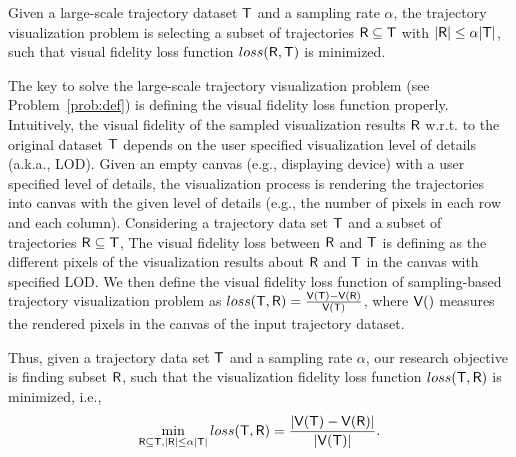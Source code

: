 \begin{problem}\label{prob:def}
Given a large-scale trajectory dataset $\mathsf{T}$ and a sampling rate $\alpha$,
the trajectory visualization problem is selecting a subset of trajectories $\mathsf{R} \subseteq \mathsf{T}$ with $|\mathsf{R}| \leq \alpha |\mathsf{T}|$,
such that visual fidelity loss function $loss(\mathsf{R},\mathsf{T})$ is minimized.
\end{problem}



The key to solve the large-scale trajectory visualization problem (see Problem~\ref{prob:def}) is defining the visual fidelity loss function properly.
Intuitively, the visual fidelity of the sampled visualization results $\mathsf{R}$ w.r.t. to the original dataset $\mathsf{T}$ depends on the user specified visualization level of details (a.k.a., LOD).
Given an empty canvas (e.g., displaying device) with a user specified level of details,
the visualization process is rendering the trajectories into canvas with the given level of details (e.g., the number of pixels in each row and each column).
Considering a trajectory data set $\mathsf{T}$ and a subset of trajectories $\mathsf{R} \subseteq \mathsf{T}$,
The visual fidelity loss between $\mathsf{R}$ and $\mathsf{T}$ is defining as the different pixels of the visualization results about $\mathsf{R}$ and $\mathsf{T}$ in the canvas with specified LOD.
We then define the visual fidelity loss function of sampling-based trajectory visualization problem as $loss(\mathsf{T}, \mathsf{R}) = \frac{\mathsf{V}(\mathsf{T}) - \mathsf{V}(\mathsf{R})}{\mathsf{V}(\mathsf{T})}$,
where $\mathsf{V}()$ measures the rendered pixels in the canvas of the input trajectory dataset.

Thus, given a trajectory data set $\mathsf{T}$ and a sampling rate $\alpha$,
our research objective is finding subset $\mathsf{R}$, such that  the visualization fidelity loss function $loss(\mathsf{T}, \mathsf{R})$ is minimized,
i.e.,
$$ \min_{\mathsf{R} \subseteq \mathsf{T}, |\mathsf{R}| \leq \alpha |\mathsf{T}|}  loss(\mathsf{T}, \mathsf{R}) =  \frac{|\mathsf{V}(\mathsf{T}) - \mathsf{V}(\mathsf{R})|}{|\mathsf{V}(\mathsf{T})|}. $$ %



